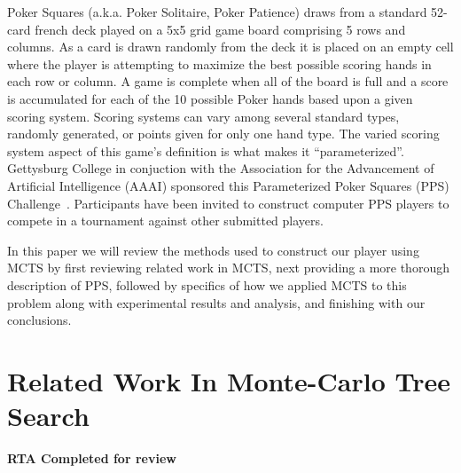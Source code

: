 \documentclass[letterpaper]{article}
\begin{document}
Poker Squares (a.k.a. Poker Solitaire, Poker Patience) draws from a standard 52-card french deck played on a 5x5 grid game board comprising 5 rows and columns. As a card is drawn randomly from the deck it is placed on an empty cell where the player is attempting to maximize the best possible scoring hands in each row or column. A game is complete when all of the board is full and a score is accumulated for each of the 10 possible Poker hands based upon a given scoring system. Scoring systems can vary among several standard types, randomly generated, or points given for only one hand type. The varied scoring system aspect of this game's definition is what makes it ``parameterized''. Gettysburg College in conjuction with the Association for the Advancement of Artificial Intelligence (AAAI) sponsored this Parameterized Poker Squares (PPS) Challenge~\cite{neller2014nsg}. Participants have been invited to construct computer PPS players to compete in a  tournament against other submitted players.

In this paper we will review the methods used to construct our player using MCTS by first reviewing related work in MCTS, next providing a more thorough description of PPS, followed by specifics of how we applied MCTS to this problem along with experimental results and analysis, and finishing with our conclusions.

\section{Related Work In Monte-Carlo Tree Search}
{\bf RTA Completed for review}



\end{document}
